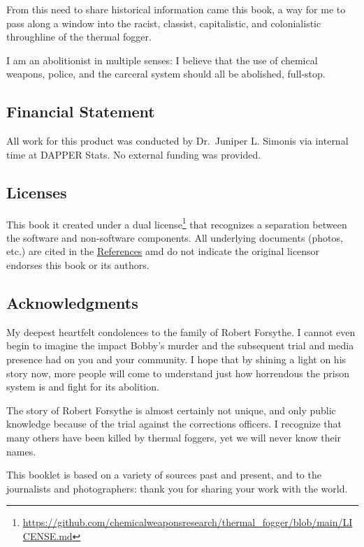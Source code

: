 \documentclass[
  12pt,
]{krantz}
\renewcommand{\href}[2]{#2\footnote{\url{#1}}}
\begin{document}
From this need to share historical information came this book, a way for me to pass along a window into the racist, classist, capitalistic, and colonialistic throughline of the thermal fogger.

I am an abolitionist in multiple senses: I believe that the use of chemical weapons, police, and the carceral system should all be abolished, full-stop.

\hypertarget{financial-statement}{%
\subsection*{Financial Statement}\label{financial-statement}}


All work for this product was conducted by Dr.~Juniper L. Simonis via internal time at DAPPER Stats.
No external funding was provided.

\hypertarget{licenses}{%
\subsection*{Licenses}\label{licenses}}


This book it created under a \href{https://github.com/chemicalweaponsresearch/thermal_fogger/blob/main/LICENSE.md}{dual license} that recognizes a separation between the software and non-software components.
All underlying documents (photos, etc.) are cited in the \protect\hyperlink{References}{References} amd do not indicate the original licensor endorses this book or its authors.

\hypertarget{acknowledgments}{%
\subsection*{Acknowledgments}\label{acknowledgments}}


My deepest heartfelt condolences to the family of Robert Forsythe.
I cannot even begin to imagine the impact Bobby's murder and the subsequent trial and media presence had on you and your community.
I hope that by shining a light on his story now, more people will come to understand just how horrendous the prison system is and fight for its abolition.

The story of Robert Forsythe is almost certainly not unique, and only public knowledge because of the trial against the corrections officers.
I recognize that many others have been killed by thermal foggers, yet we will never know their names.

This booklet is based on a variety of sources past and present, and to the journalists and photographers: thank you for sharing your work with the world.
\end{document}

